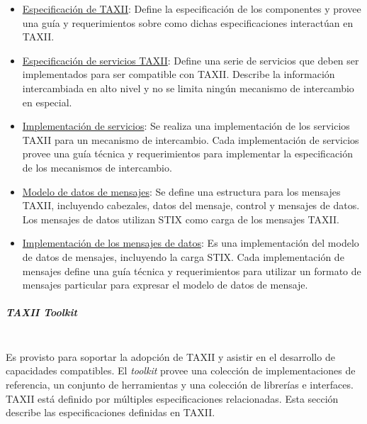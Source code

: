 \begin{itemize}
  \item \underline{Especificación de TAXII}: Define la especificación de los componentes y 
  provee una guía y requerimientos sobre como dichas especificaciones 
  interactúan en TAXII.
  \item \underline{Especificación de servicios TAXII}: Define una serie de servicios que 
  deben ser implementados para ser compatible con TAXII. Describe la información 
  intercambiada en alto nivel y no se limita  ningún mecanismo de intercambio en 
  especial.
  \item \underline{Implementación de servicios}: Se realiza una implementación de los 
  servicios TAXII para un mecanismo de intercambio. Cada implementación de 
  servicios provee una guía técnica y requerimientos para implementar la 
  especificación de los mecanismos de intercambio.
  \item \underline{Modelo de datos de mensajes}: Se define una estructura para los mensajes 
  TAXII, incluyendo cabezales, datos del mensaje, control y mensajes de datos. 
  Los mensajes de datos utilizan STIX como carga de los mensajes TAXII.
  \item \underline{Implementación de los mensajes de datos}: Es una implementación del 
  modelo de datos de mensajes, incluyendo la carga STIX. Cada implementación de 
  mensajes define una guía técnica y requerimientos para utilizar un formato de 
  mensajes particular para expresar el modelo de datos de mensaje.
\end{itemize}

\subparagraph{TAXII Toolkit}\ \\

Es provisto para soportar la adopción de TAXII y asistir en el desarrollo de 
capacidades compatibles. El \textit{toolkit} provee una colección de implementaciones de 
referencia, un conjunto de herramientas y una colección de librerías e 
interfaces.\\

TAXII está definido por múltiples especificaciones relacionadas. Esta sección 
describe las especificaciones definidas en TAXII.

